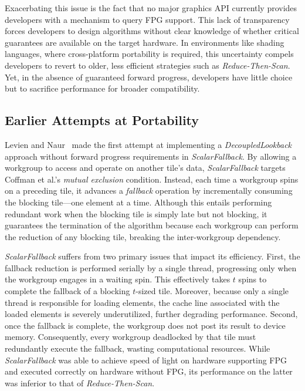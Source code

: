 \documentclass[sigconf]{acmart}
\begin{document}
Exacerbating this issue is the fact that no major graphics API currently provides developers with a mechanism to query FPG support. This lack of transparency forces developers to design algorithms without clear knowledge of whether critical guarantees are available on the target hardware. In environments like shading languages, where cross-platform portability is required, this uncertainty compels developers to revert to older, less efficient strategies such as \emph{Reduce-Then-Scan}. Yet, in the absence of guaranteed forward progress, developers have little choice but to sacrifice performance for broader compatibility.

\subsection{Earlier Attempts at Portability}
Levien and Naur~\cite{Raph2021} made the first attempt at implementing a \emph{DecoupledLookback} approach without forward progress requirements in \emph{ScalarFallback}. By allowing a workgroup to access and operate on another tile’s data, \emph{ScalarFallback} targets Coffman et al.'s \emph{mutual exclusion} condition. Instead, each time a workgroup spins on a preceding tile, it advances a \emph{fallback} operation by incrementally consuming the blocking tile---one element at a time. Although this entails performing redundant work when the blocking tile is simply late but not blocking, it guarantees the termination of the algorithm because each workgroup can perform the reduction of any blocking tile, breaking the inter-workgroup dependency.

\emph{ScalarFallback} suffers from two primary issues that impact its efficiency. First, the fallback reduction is performed serially by a single thread, progressing only when the workgroup engages in a waiting spin. This effectively takes $t$ spins to complete the fallback of a blocking $t$-sized tile. Moreover, because only a single thread is responsible for loading elements, the cache line associated with the loaded elements is severely underutilized, further degrading performance. Second, once the fallback is complete, the workgroup does not post its result to device memory. Consequently, every workgroup deadlocked by that tile must redundantly execute the fallback, wasting computational resources. While \emph{ScalarFallback} was able to achieve speed of light on hardware supporting FPG and executed correctly on hardware without FPG, its performance on the latter was inferior to that of \emph{Reduce-Then-Scan}.
\end{document}
